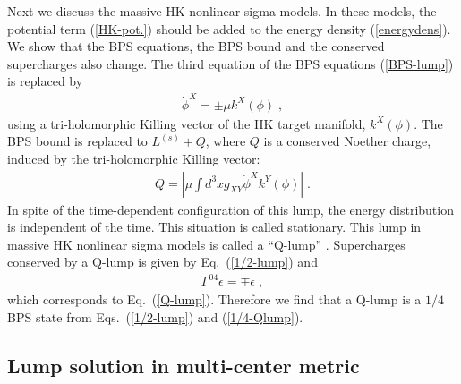 \documentclass[a4paper,12pt]{article}
\begin{document}
Next we discuss the massive HK nonlinear sigma models. 
In these models, the potential term (\ref{HK-pot.}) 
should be added to the energy density (\ref{energydens}).  
We show that the BPS equations, 
the BPS bound and the conserved 
supercharges also change. 
The third equation of the BPS equations (\ref{BPS-lump}) 
is replaced by \cite{Abraham}
\begin{eqnarray}
  \dot{\phi}^X = \pm \mu k^X (\phi) \;,
\label{Q-lump}
\end{eqnarray}
using a tri-holomorphic Killing vector 
of the HK target manifold, $k^X (\phi)$.
The BPS bound is replaced to $L^{(s)}+Q$, 
where $Q$ is a conserved Noether charge, induced by 
the tri-holomorphic Killing vector:  
\begin{eqnarray}
  Q = \left| \mu \int d^3x g_{XY}\dot{\phi}^X k^Y(\phi) \right| \;.
  \label{eq:topological_charge}
\end{eqnarray}
In spite of the time-dependent configuration of this lump, 
the energy distribution is independent of the time.  
This situation is called stationary. 
This lump in massive HK nonlinear sigma models is called 
a ``Q-lump'' \cite{Abraham}.
Supercharges conserved by a Q-lump is 
given by Eq.~(\ref{1/2-lump}) and 
\begin{eqnarray}
 \Gamma^{04}\epsilon = \mp\epsilon \;,
\label{1/4-Qlump}
\end{eqnarray}
which corresponds to Eq.~(\ref{Q-lump}).
Therefore we find that 
a Q-lump is a $1/4$ BPS state from Eqs.~(\ref{1/2-lump}) and 
(\ref{1/4-Qlump}). 


\subsection{Lump solution in multi-center metric}\label{sc:Multi}
\end{document}
